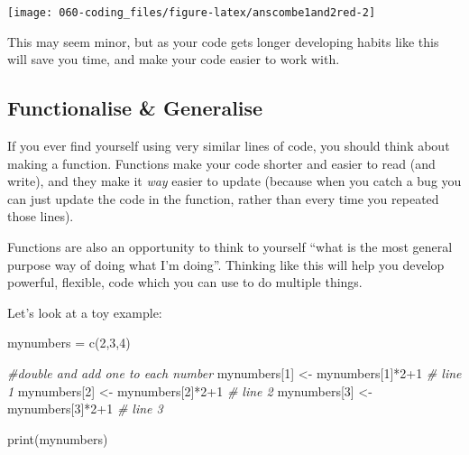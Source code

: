 \documentclass[
]{book}
\newenvironment{Shaded}{\begin{snugshade}}{\end{snugshade}}
\newcommand{\CommentTok}[1]{\textcolor[rgb]{0.56,0.35,0.01}{\textit{#1}}}
\newcommand{\DecValTok}[1]{\textcolor[rgb]{0.00,0.00,0.81}{#1}}
\newcommand{\FunctionTok}[1]{\textcolor[rgb]{0.00,0.00,0.00}{#1}}
\newcommand{\NormalTok}[1]{#1}
\newcommand{\OtherTok}[1]{\textcolor[rgb]{0.56,0.35,0.01}{#1}}
\newcommand{\SpecialCharTok}[1]{\textcolor[rgb]{0.00,0.00,0.00}{#1}}
\begin{document}
\begin{center}\texttt{[image: 060-coding\_files/figure-latex/anscombe1and2red-2]} \end{center}

This may seem minor, but as your code gets longer developing habits like this will save you time, and make your code easier to work with.

\hypertarget{functionalise-generalise}{%
\subsection{Functionalise \& Generalise}\label{functionalise-generalise}}

If you ever find yourself using very similar lines of code, you should think about making a function. Functions make your code shorter and easier to read (and write), and they make it \emph{way} easier to update (because when you catch a bug you can just update the code in the function, rather than every time you repeated those lines).

Functions are also an opportunity to think to yourself ``what is the most general purpose way of doing what I'm doing''. Thinking like this will help you develop powerful, flexible, code which you can use to do multiple things.

Let's look at a toy example:

\begin{Shaded}
\begin{Highlighting}[]
\NormalTok{mynumbers }\OtherTok{=} \FunctionTok{c}\NormalTok{(}\DecValTok{2}\NormalTok{,}\DecValTok{3}\NormalTok{,}\DecValTok{4}\NormalTok{)}

\CommentTok{\#double and add one to each number}
\NormalTok{mynumbers[}\DecValTok{1}\NormalTok{] }\OtherTok{\textless{}{-}}\NormalTok{ mynumbers[}\DecValTok{1}\NormalTok{]}\SpecialCharTok{*}\DecValTok{2}\SpecialCharTok{+}\DecValTok{1} \CommentTok{\# line 1}
\NormalTok{mynumbers[}\DecValTok{2}\NormalTok{] }\OtherTok{\textless{}{-}}\NormalTok{ mynumbers[}\DecValTok{2}\NormalTok{]}\SpecialCharTok{*}\DecValTok{2}\SpecialCharTok{+}\DecValTok{1} \CommentTok{\# line 2}
\NormalTok{mynumbers[}\DecValTok{3}\NormalTok{] }\OtherTok{\textless{}{-}}\NormalTok{ mynumbers[}\DecValTok{3}\NormalTok{]}\SpecialCharTok{*}\DecValTok{2}\SpecialCharTok{+}\DecValTok{1} \CommentTok{\# line 3}

\FunctionTok{print}\NormalTok{(mynumbers)}
\end{Highlighting}
\end{Shaded}
\end{document}
